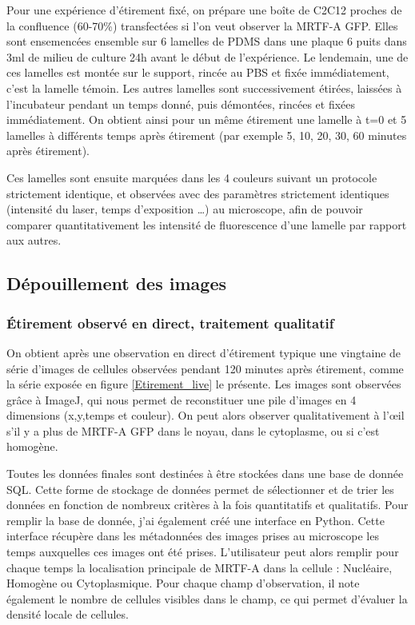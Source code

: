 	Pour une expérience d'étirement fixé, on prépare une boîte de C2C12 proches de la confluence (60-70\%) transfectées si l'on veut observer la MRTF-A GFP. Elles sont ensemencées ensemble sur 6 lamelles de PDMS dans une plaque 6 puits dans 3ml de milieu de culture 24h avant le début de l'expérience. Le lendemain, une de ces lamelles est montée sur le support, rincée au PBS et fixée immédiatement, c'est la lamelle témoin. Les autres lamelles sont successivement étirées, laissées à l'incubateur pendant un temps donné, puis démontées, rincées et fixées immédiatement. On obtient ainsi pour un même étirement une lamelle à t=0 et 5 lamelles à différents temps après étirement (par exemple 5, 10, 20, 30, 60 minutes après étirement). 
	
	Ces lamelles sont ensuite marquées dans les 4 couleurs suivant un protocole strictement identique, et observées avec des paramètres strictement identiques (intensité du laser, temps d'exposition \dots) au microscope, afin de pouvoir comparer quantitativement les intensité de fluorescence d'une lamelle par rapport aux autres. 
	

	\subsection{Dépouillement des images}
	\subsubsection{\'Etirement observé en direct, traitement qualitatif}
	On obtient après une observation en direct d'étirement typique une vingtaine de série d'images de cellules observées pendant 120 minutes après étirement, comme la série exposée en figure \ref{Etirement_live} le présente.
	Les images sont observées grâce à ImageJ, qui nous permet de reconstituer une pile d'images en 4 dimensions (x,y,temps et couleur). On peut alors observer qualitativement à l'\oe il s'il y a plus de MRTF-A GFP dans le noyau, dans le cytoplasme, ou si c'est homogène. 
	
	Toutes les données finales sont destinées à être stockées dans une base de donnée SQL. Cette forme de stockage de données permet de sélectionner et de trier les données en fonction de nombreux critères à la fois quantitatifs et qualitatifs. Pour remplir la base de donnée, j'ai également créé une interface en Python. Cette interface récupère dans les métadonnées des images prises au microscope les temps auxquelles ces images ont été prises. L'utilisateur peut alors remplir pour chaque temps la localisation principale de MRTF-A dans la cellule : Nucléaire, Homogène ou Cytoplasmique. 
	Pour chaque champ d'observation, il note également le nombre de cellules visibles dans le champ, ce qui permet d'évaluer la densité locale de cellules. 
	
